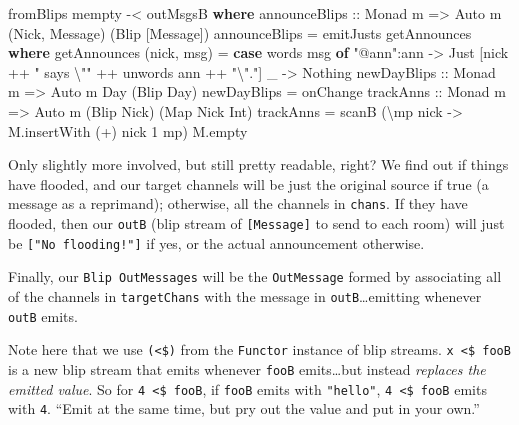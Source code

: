 \documentclass[]{article}
\newenvironment{Shaded}{}{}
\newcommand{\DataTypeTok}[1]{\textcolor[rgb]{0.56,0.13,0.00}{#1}}
\newcommand{\DecValTok}[1]{\textcolor[rgb]{0.25,0.63,0.44}{#1}}
\newcommand{\FunctionTok}[1]{\textcolor[rgb]{0.02,0.16,0.49}{#1}}
\newcommand{\KeywordTok}[1]{\textcolor[rgb]{0.00,0.44,0.13}{\textbf{#1}}}
\newcommand{\NormalTok}[1]{#1}
\newcommand{\OperatorTok}[1]{\textcolor[rgb]{0.40,0.40,0.40}{#1}}
\newcommand{\OtherTok}[1]{\textcolor[rgb]{0.00,0.44,0.13}{#1}}
\newcommand{\StringTok}[1]{\textcolor[rgb]{0.25,0.44,0.63}{#1}}
\begin{document}
\begin{Shaded}
\begin{Highlighting}[]
\NormalTok{    fromBlips }\FunctionTok{mempty} \OperatorTok{{-}<}\NormalTok{ outMsgsB}
  \KeywordTok{where}
\OtherTok{    announceBlips ::} \DataTypeTok{Monad}\NormalTok{ m }\OtherTok{=>} \DataTypeTok{Auto}\NormalTok{ m (}\DataTypeTok{Nick}\NormalTok{, }\DataTypeTok{Message}\NormalTok{) (}\DataTypeTok{Blip}\NormalTok{ [}\DataTypeTok{Message}\NormalTok{])}
\NormalTok{    announceBlips }\OtherTok{=}\NormalTok{ emitJusts getAnnounces}
      \KeywordTok{where}
\NormalTok{        getAnnounces (nick, msg) }\OtherTok{=}
          \KeywordTok{case} \FunctionTok{words}\NormalTok{ msg }\KeywordTok{of}
            \StringTok{"@ann"}\OperatorTok{:}\NormalTok{ann }\OtherTok{{-}>} \DataTypeTok{Just}\NormalTok{ [nick }\OperatorTok{++} \StringTok{" says \textbackslash{}""} \OperatorTok{++} \FunctionTok{unwords}\NormalTok{ ann }\OperatorTok{++} \StringTok{"\textbackslash{}"."}\NormalTok{]}
\NormalTok{            \_          }\OtherTok{{-}>} \DataTypeTok{Nothing}
\OtherTok{    newDayBlips ::} \DataTypeTok{Monad}\NormalTok{ m }\OtherTok{=>} \DataTypeTok{Auto}\NormalTok{ m }\DataTypeTok{Day}\NormalTok{ (}\DataTypeTok{Blip} \DataTypeTok{Day}\NormalTok{)}
\NormalTok{    newDayBlips }\OtherTok{=}\NormalTok{ onChange}
\OtherTok{    trackAnns ::} \DataTypeTok{Monad}\NormalTok{ m }\OtherTok{=>} \DataTypeTok{Auto}\NormalTok{ m (}\DataTypeTok{Blip} \DataTypeTok{Nick}\NormalTok{) (}\DataTypeTok{Map} \DataTypeTok{Nick} \DataTypeTok{Int}\NormalTok{)}
\NormalTok{    trackAnns }\OtherTok{=}\NormalTok{ scanB (\textbackslash{}mp nick }\OtherTok{{-}>}\NormalTok{ M.insertWith (}\OperatorTok{+}\NormalTok{) nick }\DecValTok{1}\NormalTok{ mp) M.empty}
\end{Highlighting}
\end{Shaded}

Only slightly more involved, but still pretty readable, right? We find out if
things have flooded, and our target channels will be just the original source if
true (a message as a reprimand); otherwise, all the channels in \texttt{chans}.
If they have flooded, then our \texttt{outB} (blip stream of
\texttt{{[}Message{]}} to send to each room) will just be
\texttt{{[}"No\ flooding!"{]}} if yes, or the actual announcement otherwise.

Finally, our \texttt{Blip\ OutMessages} will be the \texttt{OutMessage} formed
by associating all of the channels in \texttt{targetChans} with the message in
\texttt{outB}\ldots emitting whenever \texttt{outB} emits.

Note here that we use \texttt{(\textless{}\$)} from the \texttt{Functor}
instance of blip streams. \texttt{x\ \textless{}\$\ fooB} is a new blip stream
that emits whenever \texttt{fooB} emits\ldots but instead \emph{replaces the
emitted value}. So for \texttt{4\ \textless{}\$\ fooB}, if \texttt{fooB} emits
with \texttt{"hello"}, \texttt{4\ \textless{}\$\ fooB} emits with \texttt{4}.
``Emit at the same time, but pry out the value and put in your own.''
\end{document}
